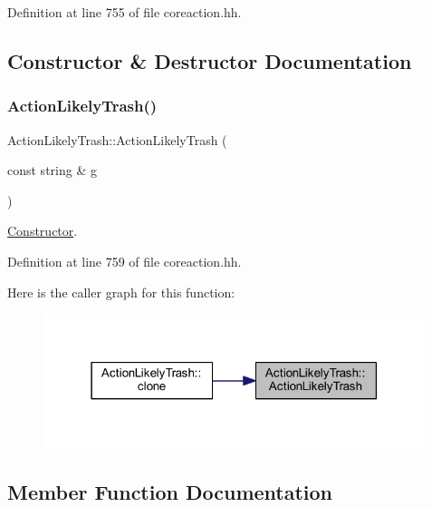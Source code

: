 Definition at line 755 of file coreaction.\+hh.



\subsection{Constructor \& Destructor Documentation}
\mbox{\label{class_action_likely_trash_a49eaf6fd21182ad4387a8c70e86c46c2}} 
\subsubsection{\texorpdfstring{ActionLikelyTrash()}{ActionLikelyTrash()}}
{\footnotesize\ttfamily Action\+Likely\+Trash\+::\+Action\+Likely\+Trash (\begin{DoxyParamCaption}\item[{const string \&}]{g }\end{DoxyParamCaption})\hspace{0.3cm}{\ttfamily [inline]}}



\mbox{\hyperlink{class_constructor}{Constructor}}. 



Definition at line 759 of file coreaction.\+hh.

Here is the caller graph for this function\+:
\nopagebreak
\begin{figure}[H]
\begin{center}
\leavevmode
\includegraphics[width=316pt]{class_action_likely_trash_a49eaf6fd21182ad4387a8c70e86c46c2_icgraph}
\end{center}
\end{figure}


\subsection{Member Function Documentation}
\mbox{\label{class_action_likely_trash_afbd2ec1783db1f08cedf5b259304f158}} 
